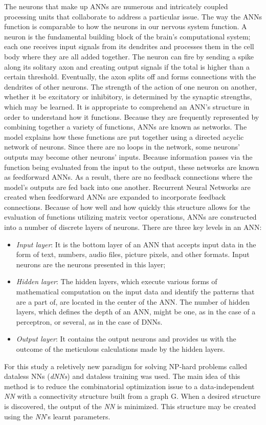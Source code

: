 The neurons that make up ANNs are numerous and intricately coupled processing units that collaborate to address a particular issue. The way the ANNs function is comparable to how the neurons in our nervous system function. A neuron is the fundamental building block of the brain's computational system; each one receives input signals from its dendrites and processes them in the cell body where they are all added together. The neuron can fire by sending a spike along its solitary axon and creating output signals if the total is higher than a certain threshold. Eventually, the axon splits off and forms connections with the dendrites of other neurons. The strength of the action of one neuron on another, whether it be excitatory or inhibitory, is determined by the synaptic strengths, which may be learned. It is appropriate to comprehend an ANN's structure in order to understand how it functions. Because they are frequently represented by combining together a variety of functions, ANNs are known as networks. The model explains how these functions are put together using a directed acyclic network of neurons. Since there are no loops in the network, some neurons' outputs may become other neurons' inputs. Because information passes via the function being evaluated from the input to the output, these networks are known as feedforward ANNs. As a result, there are no feedback connections where the model's outputs are fed back into one another. Recurrent Neural Networks are created when feedforward ANNs are expanded to incorporate feedback connections. Because of how well and how quickly this structure allows for the evaluation of functions utilizing matrix vector operations, ANNs are constructed into a number of discrete layers of neurons. There are three key levels in an ANN:
\begin{itemize}
    \item \textit{Input layer}: It is the bottom layer of an ANN that accepts input data in the form of text, numbers, audio files, picture pixels, and other formats. Input neurons are the neurons presented in this layer;
    \item \textit{Hidden layer}: The hidden layers, which execute various forms of mathematical computation on the input data and identify the patterns that are a part of, are located in the center of the ANN. The number of hidden layers, which defines the depth of an ANN, might be one, as in the case of a perceptron, or several, as in the case of DNNs.
    \item \textit{Output layer}: It contains the output neurons and provides us with the outcome of the meticulous calculations made by the hidden layers.
\end{itemize}

For this study a reletively new paradigm for solving NP-hard problems called dataless NNs (\textit{dNNs}) and dataless training was used. The main idea of this method is to reduce the combinatorial optimization issue to a data-independent \textit{NN} with a connectivity structure built from a graph G. When a desired structure is discovered, the output of the \textit{NN} is minimized. This structure may be created using the \textit{NN}'s learnt parameters.